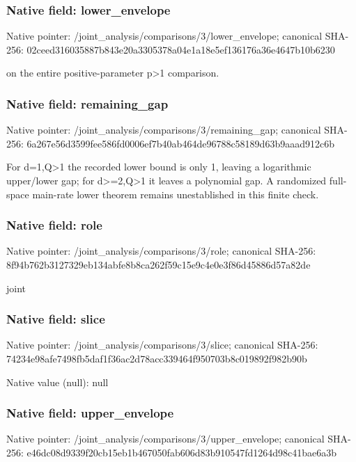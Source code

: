 \documentclass[10pt,a4paper]{article}
\begin{document}
\subsubsection{Native field: lower\_\allowbreak{}envelope}
Native pointer: /joint\_\allowbreak{}analysis/comparisons/3/lower\_\allowbreak{}envelope; canonical SHA-256: 02ceed316035887b843e20a3305378a04e1a18e5ef136176a36e4647b10b6230

\begingroup\raggedright{} on the entire positive-parameter p>1 comparison.\par\endgroup

\subsubsection{Native field: remaining\_\allowbreak{}gap}
Native pointer: /joint\_\allowbreak{}analysis/comparisons/3/remaining\_\allowbreak{}gap; canonical SHA-256: 6a267e56d3599fee586fd0006ef7b40ab464de96788c58189d63b9aaad912c6b

\begingroup\raggedright\sloppy For d=\allowbreak{}1,\allowbreak{}Q>1 the recorded lower bound is only 1,\allowbreak{} leaving a logarithmic upper/\allowbreak{}lower gap;\allowbreak{} for d>=\allowbreak{}2,\allowbreak{}Q>1 it leaves a polynomial gap. A randomized full-space main-rate lower theorem remains unestablished in this finite check.\par\endgroup

\subsubsection{Native field: role}
Native pointer: /joint\_\allowbreak{}analysis/comparisons/3/role; canonical SHA-256: 8f94b762b3127329eb134abfe8b8ca262f59c15e9c4e0e3f86d45886d57a82de

\begingroup\raggedright\sloppy joint\par\endgroup

\subsubsection{Native field: slice}
Native pointer: /joint\_\allowbreak{}analysis/comparisons/3/slice; canonical SHA-256: 74234e98afe7498fb5daf1f36ac2d78acc339464f950703b8c019892f982b90b

Native value (null): null

\subsubsection{Native field: upper\_\allowbreak{}envelope}
Native pointer: /joint\_\allowbreak{}analysis/comparisons/3/upper\_\allowbreak{}envelope; canonical SHA-256: e46dc08d9339f20cb15eb1b467050fab606d83b910547fd1264d98c41bae6a3b
\end{document}
